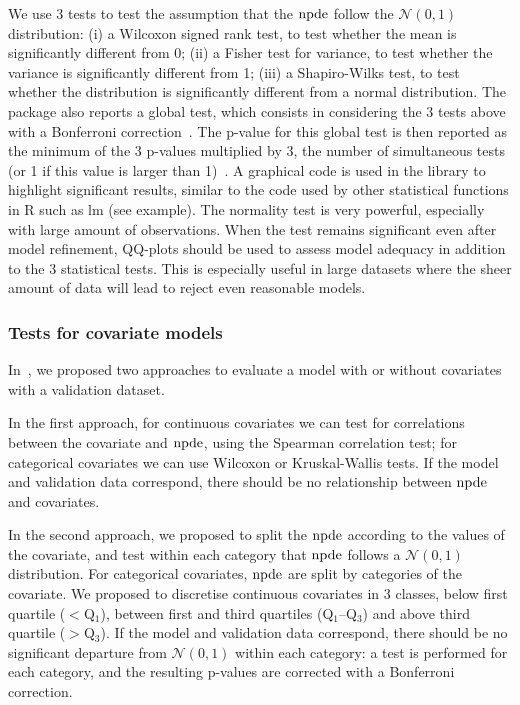 We use 3 tests to test the assumption that the ${\rm npde}$ follow the $\mathcal{N}(0, 1)$ distribution: (i) a Wilcoxon 
signed rank test, to test whether the mean is significantly different from 0; (ii) a Fisher test for variance, to 
test whether the variance is significantly different from 1; (iii) a Shapiro-Wilks test, to test whether the 
distribution is significantly different from a normal distribution. The package also reports a global test, which 
consists in considering the 3 tests above with a Bonferroni correction~\cite{Brendel10}. The p-value for this 
global test is then reported as the minimum of the 3 p-values multiplied by 3, the number of simultaneous tests (or 
1 if this value is larger than 1)~\cite{Wright}. A graphical code is used in the library to highlight significant 
results, similar to the code used by other statistical functions in {\sf R} such as {\sf lm} (see example). The 
normality test is very powerful, especially with large amount of observations. When the test remains significant 
even after model refinement, QQ-plots should be used to assess model adequacy in addition to the 3 statistical 
tests. This is especially useful in large datasets where the sheer amount of data will lead to reject even 
reasonable models.

\subsubsection{Tests for covariate models} 

\hskip 18pt In~\cite{Brendel10}, we proposed two approaches to evaluate a model with or without covariates with a 
validation dataset. 

In the first approach, for continuous covariates we can test for correlations between the covariate and ${\rm npde}$, 
using the Spearman correlation test; for categorical covariates we can use Wilcoxon or Kruskal-Wallis tests. If the 
model and validation data correspond, there should be no relationship between ${\rm npde}$ and covariates.

In the second approach, we proposed to split the ${\rm npde}$ according to the values of the covariate, and test within 
each category that ${\rm npde}$ follows a $\mathcal{N}(0,1)$ distribution. For categorical covariates, ${\rm npde}$ are split 
by categories of the covariate. We proposed to discretise continuous covariates in 3 classes, below first quartile 
($<$Q$_1$), between first and third quartiles (Q$_1$--Q$_3$) and above third quartile ($>$Q$_3$). If the model and 
validation data correspond, there should be no significant departure from $\mathcal{N}(0,1)$ within each category: 
a test is performed for each category, and the resulting p-values are corrected with a Bonferroni correction.

